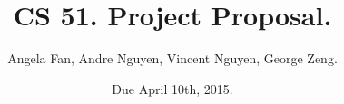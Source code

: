 \documentclass[12pt]{article}
\begin{document}
\title{CS 51. Project Proposal.}
\date{Due April 10th, 2015.}
\author{Angela Fan, Andre Nguyen, Vincent Nguyen, George Zeng.}
\maketitle
\end{document}
